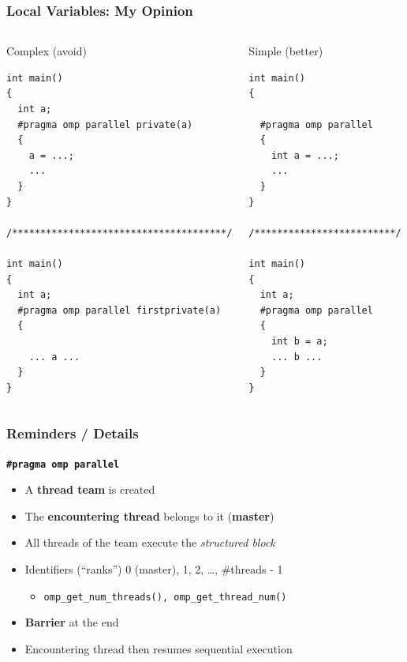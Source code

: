 \documentclass{beamer}
\begin{document}

\begin{frame}[fragile=singleslide]
  \frametitle{Local Variables: My Opinion}


  \begin{columns}[t]
  \column[T]{6cm}
  \begin{alertblock}{Complex (avoid)}
    \begin{verbatim}
int main()
{
  int a;
  #pragma omp parallel private(a)
  {
    a = ...;
    ...
  }
}

/**************************************/

int main()
{
  int a;
  #pragma omp parallel firstprivate(a)
  {

    ... a ...
  }
}

\end{verbatim}
\end{alertblock}

  \column[T]{4cm}
  \begin{exampleblock}{Simple (better)}
    \begin{verbatim}
int main()
{

  #pragma omp parallel
  {
    int a = ...;
    ...
  }
}

/*************************/

int main()
{
  int a;  
  #pragma omp parallel
  {
    int b = a;
    ... b ...
  }
}
\end{verbatim}
\end{exampleblock}
\end{columns}

\end{frame}

\begin{frame}[fragile=singleslide]
  \frametitle{Reminders / Details}
  
\begin{block}{\bf \texttt{\#pragma omp parallel}}
  \begin{itemize}
  \item A \alert{\textbf{thread team}} is created
  \item The \textbf{encountering thread} belongs to it (\textbf{master})
  \item All threads of the team execute the \textit{structured block}
  \item Identifiers (``ranks'') 0 (master), 1, 2, \dots, \#threads - 1
    \begin{itemize}
      \item \texttt{omp_get_num_threads(), omp_get_thread_num()}
    \end{itemize}
  \item \textbf{Barrier} at the end
  \item Encountering thread then resumes sequential execution
  \end{itemize}
\end{block}
\end{frame}
\end{document}
